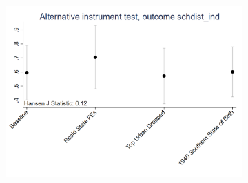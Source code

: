 \documentclass{article}
\begin{document}
\begin{figure}[htbp]
\begin{subfigure}{0.3\textwidth}
        \label{fig:sub2}
    \end{subfigure}
    \begin{subfigure}{0.3\textwidth}
        \includegraphics[width=\linewidth]{exhibits_old/figures/exogeneity_tests/D16_alt_inst_pooled_schdist_ind.png}
        \label{fig:sub3}
    \end{subfigure}


\end{figure}
\end{document}
